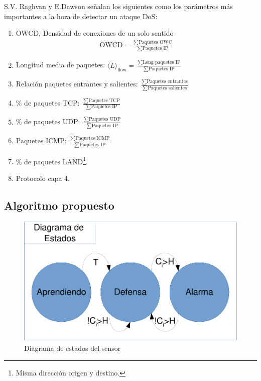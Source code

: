 S.V. Raghvan y E.Dawson señalan los siguientes como los parámetros más importantes a la hora de detectar un ataque 
\gls{DoS}:


\begin{enumerate}
 \item \gls{OWCD}, Densidad de conexiones de un solo sentido
 \begin{align*}
  \text{OWCD} = \frac{\sum\text{Paquetes OWC}}{\sum\text{Paquetes IP}}
 \end{align*}

 \item Longitud media de paquetes: 
   $\langle L\rangle_{\text{flow}} = \frac{\sum\text{Long paquetes IP}}{\sum\text{Paquetes IP}}$
 
 \item Relación paquetes entrantes y salientes: 
   $\frac{\sum\text{Paquetes entrantes}}{\sum\text{Paquetes salientes}}$
 
 \item \% de paquetes TCP: $\frac{\sum\text{Paquetes TCP}}{\sum\text{Paquetes IP}}$ 
 \item \% de paquetes UDP: $\frac{\sum\text{Paquetes UDP}}{\sum\text{Paquetes IP}}$
 \item Paquetes ICMP: $\frac{\sum\text{Paquetes ICMP}}{\sum\text{Paquetes IP}}$
 \item \% de paquetes LAND\footnote{Misma dirección origen y destino.}.
 \item Protocolo capa 4.
\end{enumerate}

\subsection{Algoritmo propuesto}
\begin{figure}[htbp]
\centering
\includegraphics[width=0.8\columnwidth]{CapituloCusum/Figuras/DiagramaEstados-crop}
\caption{Diagrama de estados del sensor}
\label{fig:diagrama_estados} 
\end{figure}

